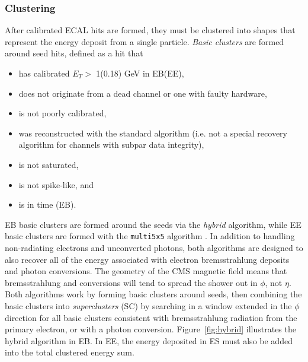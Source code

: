 \documentclass[dissertation.tex]{subfiles}
\begin{document}
\subsubsection{Clustering}
\label{sec:Clustering}

After calibrated ECAL hits are formed, they must be clustered into shapes that represent the energy deposit from a single particle.  \textit{Basic clusters} are formed around seed hits, defined as a hit that

\begin{itemize}
\item has calibrated $E_{T} >$ 1(0.18) GeV in EB(EE),
\item does not originate from a dead channel or one with faulty hardware,
\item is not poorly calibrated,
\item was reconstructed with the standard algorithm (i.e. not a special recovery algorithm for channels with subpar data integrity),
\item is not saturated,
\item is not spike-like, and
\item is in time (EB).
\end{itemize}
%
EB basic clusters are formed around the seeds via the \textit{hybrid} algorithm, while EE basic clusters are formed with the \verb+multi5x5+ algorithm \cite{ECAL_SC_note}.  In addition to handling non-radiating electrons and unconverted photons, both algorithms are designed to also recover all of the energy associated with electron bremsstrahlung deposits and photon conversions.  The geometry of the CMS magnetic field means that bremsstrahlung and conversions will tend to spread the shower out in $\phi$, not $\eta$.  Both algorithms work by forming basic clusters around seeds, then combining the basic clusters into \textit{superclusters} (SC) by searching in a window extended in the $\phi$ direction for all basic clusters consistent with bremsstrahlung radiation from the primary electron, or with a photon conversion.  Figure~\ref{fig:hybrid} illustrates the hybrid algorithm in EB.  In EE, the energy deposited in ES must also be added into the total clustered energy sum.
\end{document}
